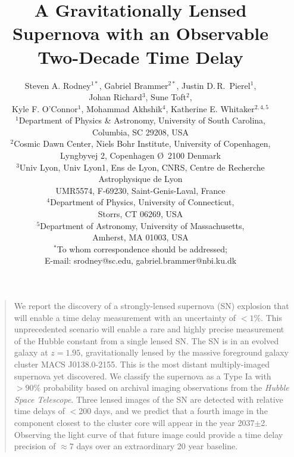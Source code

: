 \documentclass[12pt]{article}
\title{A Gravitationally Lensed Supernova with an Observable Two-Decade Time Delay}
\author{
 Steven A. Rodney$^{1\ast}$, 
 Gabriel Brammer$^{2\ast}$,  
 Justin D.\,R.~Pierel$^{1}$,\\ 
 Johan Richard$^{3}$, 
 Sune Toft$^{2}$,\\  
 Kyle F. O'Connor$^{1}$, 
 Mohammad Akhshik$^{4}$, 
 Katherine E. Whitaker$^{2,4,5}$  
\\
\normalsize{$^{1}$Department of Physics \& Astronomy, University of South Carolina,}\\ \normalsize{ Columbia, SC 29208, USA}\\
\normalsize{$^{2}$Cosmic Dawn Center, Niels Bohr Institute, University of Copenhagen,}\\ \normalsize{Lyngbyvej 2, Copenhagen \O\ 2100 Denmark}\\
\normalsize{$^{3}$Univ Lyon, Univ Lyon1, Ens de Lyon, CNRS, Centre de Recherche Astrophysique de Lyon}\\ \normalsize{UMR5574, F-69230, Saint-Genis-Laval, France}\\
\normalsize{$^{4}$Department of Physics, University of Connecticut,}\\ \normalsize{Storrs, CT 06269, USA}\\
\normalsize{$^{5}$Department of Astronomy, University of Massachusetts,}\\ \normalsize{Amherst, MA 01003, USA}\\
\normalsize{$^\ast$To whom correspondence should be addressed;}\\ \normalsize{E-mail:  srodney@sc.edu, gabriel.brammer@nbi.ku.dk}
}
\date{}
\newenvironment{sciabstract}{%
\begin{quote} \bf}
{\end{quote}}
\begin{document}
 


\baselineskip24pt


\maketitle 



\begin{sciabstract}

  We report the discovery of a strongly-lensed supernova (SN) explosion that will enable a time delay measurement with an uncertainty of $<1\%$. This unprecedented scenario will enable a rare and highly precise measurement of the Hubble constant from a single lensed SN.  The SN is in an evolved galaxy at $z=1.95$, gravitationally lensed by the massive foreground galaxy cluster MACS J0138.0-2155.  This is the most distant multiply-imaged supernova yet discovered.  We classify the supernova as a Type Ia with {$>90\%$} probability based on archival imaging observations from the \textit{Hubble Space Telescope}.  Three lensed images of the SN are detected with relative time delays of $<$200 days, and we predict that a fourth image in the component closest to the cluster core will appear in the year 2037$\pm$2.  Observing the light curve of that future image could provide a time delay precision of $\approx 7$ days over an extraordinary 20 year baseline. 

\end{sciabstract}
\end{document}

